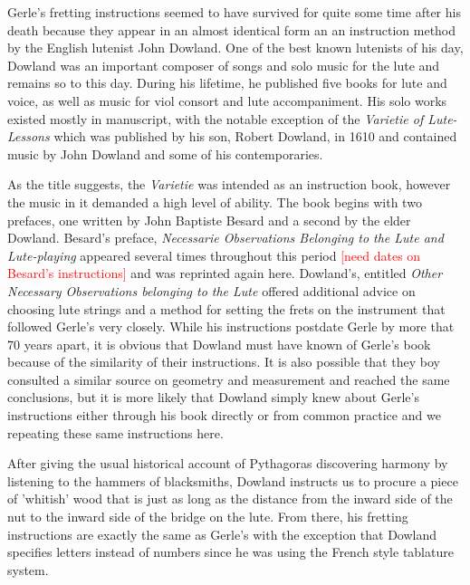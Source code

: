 Gerle's fretting instructions seemed to have survived for quite some time after his
death because they appear in an almost identical form an an instruction method
by the English lutenist John Dowland. One of the best known lutenists of his day,
Dowland was an important composer of songs and solo music for the lute and remains so
to this day. During his lifetime, he published five books for lute and voice, as well
as music for viol consort and lute accompaniment.  His solo works existed mostly in
manuscript, with the notable exception of the \textit{Varietie of Lute-Lessons} which was
published by his son, Robert Dowland, in 1610 and contained music by John Dowland and
some of his contemporaries.

As the title suggests, the \textit{Varietie} was intended as an instruction book,
however the music in it demanded a high level of ability.  The book begins with two
prefaces, one written by John Baptiste Besard  and a second by the elder Dowland.
Besard's preface, \textit{Necessarie Observations Belonging to the Lute and
Lute-playing} appeared several times throughout this period \textcolor{red}{[need dates
on Besard's instructions]} and was reprinted again here.  Dowland's, entitled \textit{
Other Necessary Observations belonging to the Lute} offered additional advice on
choosing lute strings and a method for setting the frets on the instrument that
followed Gerle's very closely. While his instructions postdate Gerle by more that 70
years apart, it is obvious that Dowland must have known of Gerle's book because of the
similarity of their instructions.  It is also possible that they boy consulted a
similar source on geometry and measurement and reached the same conclusions, but it is
more likely that Dowland simply knew about Gerle's instructions either through his book
directly or from common practice and we repeating these same instructions here.

After giving the usual historical account of Pythagoras discovering harmony by
listening to the hammers of blacksmiths, Dowland instructs us to procure a piece
of 'whitish' wood that is just as long as the distance from the inward
side of the nut to the inward side of the bridge on the lute.  From there, his
fretting instructions are exactly the same as Gerle's with the exception that
Dowland specifies letters instead of numbers since he was using the French style
tablature system.

